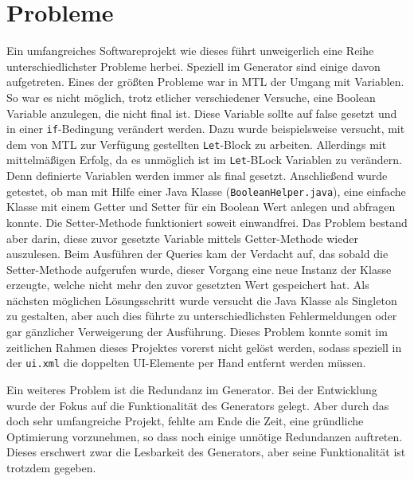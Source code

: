 \section{Probleme} \label{Probleme}
Ein umfangreiches Softwareprojekt wie dieses führt unweigerlich eine Reihe unterschiedlichster Probleme herbei. Speziell im Generator sind einige davon aufgetreten.
Eines der größten Probleme war in MTL der Umgang mit Variablen. So war es nicht möglich, trotz etlicher verschiedener Versuche, eine Boolean Variable anzulegen, die nicht final ist. Diese Variable sollte auf false gesetzt und in einer \texttt{if}-Bedingung verändert werden. 
Dazu wurde beispielsweise versucht, mit dem von MTL zur Verfügung gestellten \texttt{Let}-Block zu arbeiten. Allerdings mit mittelmäßigen Erfolg, da es unmöglich ist im \texttt{Let}-BLock Variablen zu verändern. Denn definierte Variablen werden immer als final gesetzt. Anschließend wurde getestet, ob man mit Hilfe einer Java Klasse (\texttt{BooleanHelper.java}), eine einfache Klasse mit einem Getter und Setter für ein Boolean Wert anlegen und abfragen konnte. Die Setter-Methode funktioniert soweit einwandfrei. Das Problem bestand aber darin, diese zuvor gesetzte Variable mittels Getter-Methode wieder auszulesen. Beim Ausführen der Queries kam der Verdacht auf, das sobald die Setter-Methode aufgerufen wurde, dieser Vorgang eine neue Instanz der Klasse erzeugte, welche nicht mehr den zuvor gesetzten Wert gespeichert hat. Als nächsten möglichen Lösungsschritt wurde versucht die Java Klasse als Singleton zu gestalten, aber auch dies führte zu unterschiedlichsten Fehlermeldungen oder gar gänzlicher Verweigerung der Ausführung. 
Dieses Problem konnte somit im zeitlichen Rahmen dieses Projektes vorerst nicht gelöst werden, sodass speziell in der \texttt{ui.xml} die doppelten UI-Elemente per Hand entfernt werden müssen.
 
Ein weiteres Problem ist die Redundanz im Generator. Bei der Entwicklung wurde der Fokus auf die Funktionalität des Generators gelegt. Aber durch das doch sehr umfangreiche Projekt, fehlte am Ende die Zeit, eine gründliche Optimierung vorzunehmen, so dass noch einige unnötige Redundanzen auftreten. Dieses erschwert zwar die Lesbarkeit des Generators, aber seine Funktionalität ist trotzdem gegeben.
